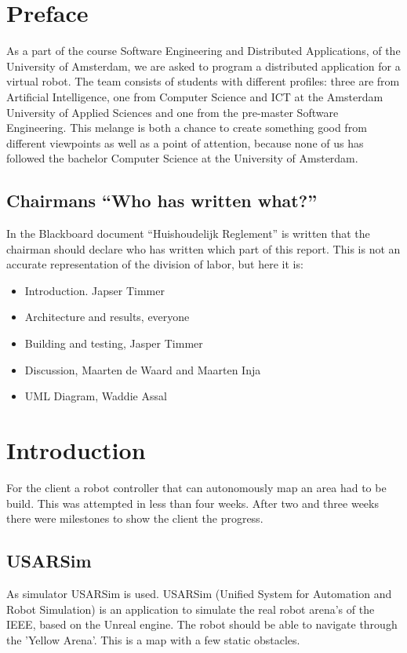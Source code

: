 \documentclass[titlepage, a4paper,10pt]{article}
\begin{document}


\tableofcontents 
\newpage

\section{Preface}
As a part of the course Software Engineering and Distributed Applications, of
the University of Amsterdam, we are asked to program a distributed application
for a virtual robot. The team consists of students with different profiles:
three are from Artificial Intelligence, one from Computer Science and ICT at the
Amsterdam University of Applied Sciences and one from the pre-master Software
Engineering. This melange is both a chance to create something good from
different viewpoints as well as a point of attention, because none of us has
followed the bachelor Computer Science at the University of Amsterdam. 

\subsection{Chairmans ``Who has written what?''}
In the Blackboard document ``Huishoudelijk Reglement'' is written that the chairman should declare who has written which
part of this report. This is not an accurate representation of the division of labor, but here it is:
\begin{itemize}
    \item Introduction. Japser Timmer
    \item Architecture and results, everyone
    \item Building and testing, Jasper Timmer
    \item Discussion, Maarten de Waard and Maarten Inja
    \item UML Diagram, Waddie Assal
\end{itemize}
\newpage

\section{Introduction}
For the client a robot controller that can autonomously map an area had to be build. This was attempted in less than four weeks. After two and three weeks there were milestones to show the client the progress.

\subsection{USARSim}
As simulator USARSim is used. USARSim (Unified System for Automation and Robot Simulation) is an application to simulate the real robot arena's of the IEEE, based on the Unreal engine. The robot should be able to navigate through the 'Yellow Arena'. This is a map with a few static obstacles.
\end{document}

